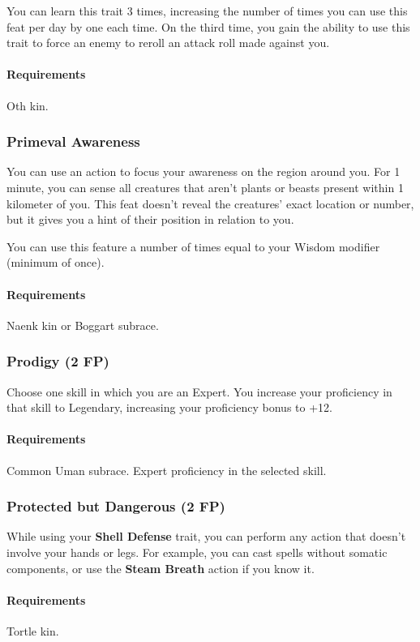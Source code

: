     You can learn this trait 3 times, increasing the number of times you can use this feat per day by one each time.
    On the third time, you gain the ability to use this trait to force an enemy to reroll an attack roll made against you.
    \paragraph{Requirements} Oth kin.
\subsubsection{Primeval Awareness} \label{feat::primevalawareness}
    You can use an action to focus your awareness on the region around you.
    For 1 minute, you can sense all creatures that aren't plants or beasts present within 1 kilometer of you.
    This feat doesn't reveal the creatures' exact location or number, but it gives you a hint of their position in relation to you.

    You can use this feature a number of times equal to your Wisdom modifier (minimum of once).
    \paragraph{Requirements} Naenk kin or Boggart subrace.
\subsubsection{Prodigy (2 FP)} \label{feat::prodigy}
    Choose one skill in which you are an Expert.
    You increase your proficiency in that skill to Legendary, increasing your proficiency bonus to +12.
    \paragraph{Requirements} Common Uman subrace. Expert proficiency in the selected skill.
\subsubsection{Protected but Dangerous (2 FP)} \label{feat::protectedbutdangerous}
    While using your \textbf{Shell Defense} trait, you can perform any action that doesn't involve your hands or legs.
    For example, you can cast spells without somatic components, or use the \textbf{Steam Breath} action if you know it.
    \paragraph{Requirements} Tortle kin.
